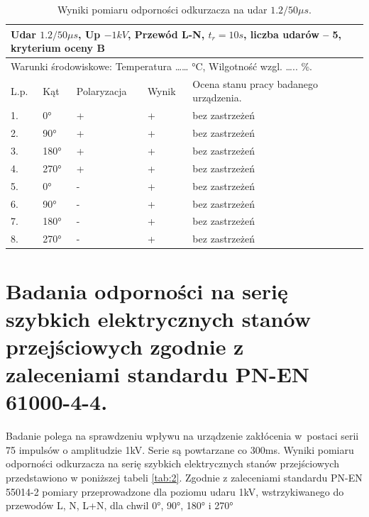 \documentclass{classrep}
\begin{document}
\begin{table}[H]
	\centering
	\caption{Wyniki pomiaru odporności odkurzacza na udar $1.2/50 \mu s$.}
	\label{tab:1}
	\begin{tabular}{|l|l|l|l|l|}
		\hline
		\multicolumn{5}{|l|}{Udar $ 1.2/50 \mu s$, Up $-1kV$, Przewód L-N, $t_r =10s$, liczba udarów – 5, kryterium oceny B} \\ \hline
		\multicolumn{5}{|l|}{Warunki środowiskowe: Temperatura …… °C, Wilgotność wzgl. ….. \%.}                         \\ \hline
		L.p.         & Kąt          & Polaryzacja        & Wynik        & Ocena stanu pracy badanego urządzenia.        \\ \hline
		1.           & 0°           & +                  & +            & bez zastrzeżeń                                \\ \hline
		2.           & 90°          & +                  & +            & bez zastrzeżeń                                \\ \hline
		3.           & 180°         & +                  & +            & bez zastrzeżeń                                \\ \hline
		4.           & 270°         & +                  & +            & bez zastrzeżeń                                \\ \hline
		5.           & 0°           & -                  & +            & bez zastrzeżeń                                \\ \hline
		6.           & 90°          & -                  & +            & bez zastrzeżeń                                \\ \hline
		7.           & 180°         & -                  & +            & bez zastrzeżeń                                \\ \hline
		8.           & 270°         & -                  & +            & bez zastrzeżeń                                \\ \hline
		\end{tabular}
\end{table}
		

\section{Badania odporności na serię szybkich elektrycznych stanów przejściowych zgodnie z zaleceniami standardu PN-EN 61000-4-4.}


Badanie polega na sprawdzeniu wpływu na urządzenie zakłócenia w postaci serii 75 impulsów o amplitudzie 1kV. Serie są powtarzane co 300ms. Wyniki pomiaru odporności odkurzacza na serię szybkich elektrycznych stanów przejściowych przedstawiono w poniższej tabeli \ref{tab:2}.  Zgodnie z zaleceniami standardu PN-EN 55014-2 pomiary przeprowadzone dla poziomu udaru 1kV, wstrzykiwanego do przewodów L, N, L+N, dla  chwil 0°, 90°, 180° i 270°
\end{document}
